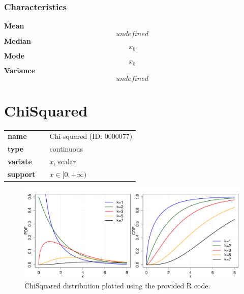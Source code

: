 \subsubsection*{Characteristics}
\smallskip \noindent \hspace{.2cm} \textbf{Mean} 
\begin{equation*}undefined\end{equation*}
\smallskip \noindent \hspace{.2cm} \textbf{Median} 
\begin{equation*}x_0\end{equation*}
\smallskip \noindent \hspace{.2cm} \textbf{Mode} 
\begin{equation*}x_0\end{equation*}
\smallskip \noindent \hspace{.2cm} \textbf{Variance} 
\begin{equation*}undefined\end{equation*}
\smallskip
\section*{ChiSquared} 

  \bigskip 

\begin{tabular}{p{2cm}cl}
\textbf{name} & & Chi-squared (ID: 0000077)\\ 
 
\textbf{type} & & continuous \\ 

\textbf{variate} & & $x$, scalar \\ 

\textbf{support} & & $x \in [0,+\infty)$
\end{tabular}

\begin{figure}[ht!]
\centering
  \includegraphics[width=140mm]{pics/ChiSquared.pdf}
 \caption{ChiSquared distribution plotted using the provided R code.}
 \label{fig:ChiSquared}
\end{figure}

